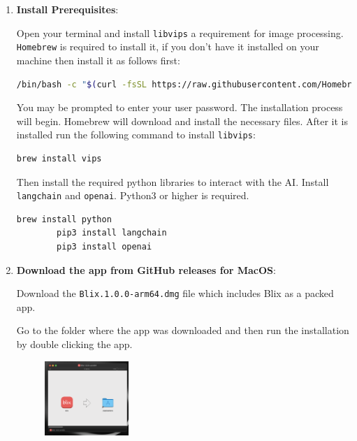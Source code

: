 \documentclass[11pt,a4paper]{article}
\def\code#1{\texttt{#1}}
\begin{document}
\begin{enumerate}[label*=\arabic*.]
	\item[\textbullet] {\bf Install Prerequisites}: 

	Open your terminal and install \code{libvips} a requirement for image
	processing. \code{Homebrew} is required to install it, if you don't have it
	installed on your machine then install it as follows first:

	\begin{lstlisting}[language=sh]
		 /bin/bash -c "$(curl -fsSL https://raw.githubusercontent.com/Homebrew/install/HEAD/install.sh)"
	\end{lstlisting}

	You may be prompted to enter your user password. The installation process
	will begin. Homebrew will download and install the necessary files. After it
	is installed run the following command to install \code{libvips}:

	\begin{lstlisting}[language=sh]
		brew install vips
	\end{lstlisting}

	Then install the required python libraries to interact with the AI. Install
	\code{langchain} and \code{openai}. Python3 or higher is required.

	\begin{lstlisting}[language=sh]
		brew install python
		pip3 install langchain
		pip3 install openai
	\end{lstlisting}

	\item[\textbullet] {\bf Download the app from GitHub releases for MacOS}: 

	Download the \code{Blix.1.0.0-arm64.dmg} file which includes Blix as a packed app.

	Go to the folder where the app was downloaded and then run the installation
	by double clicking the app.

	\begin{figure}[ht]
		\centering
		\includegraphics[width=0.3\textwidth,height=\textheight,keepaspectratio,rotate=0,origin=c]{../pics/mac-isntall.png}
	\end{figure}
\end{enumerate}
\end{document}
